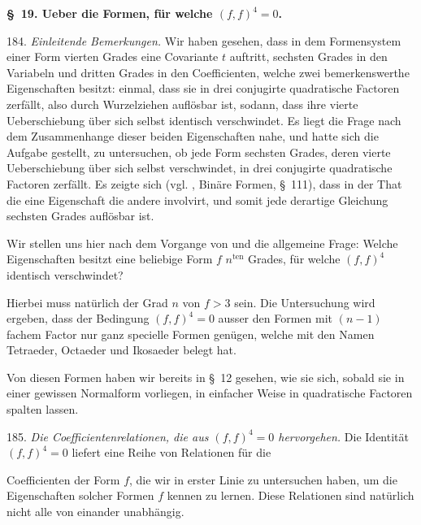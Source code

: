 \begin{center}
\textbf{\S~19. Ueber die Formen, f\"ur welche $(f,f)^4=0$.}
\end{center}

184. \textit{Einleitende Bemerkungen.} Wir haben gesehen, dass in dem Formensystem einer Form vierten Grades eine Covariante $t$ auftritt, sechsten Grades in den Variabeln und dritten Grades in den Coefficienten, welche zwei bemerkenswerthe Eigenschaften besitzt: einmal, dass sie in drei conjugirte quadratische Factoren zerf\"allt, also durch Wurzelziehen aufl\"osbar ist, sodann, dass ihre vierte Ueberschiebung \"uber sich selbst identisch verschwindet. Es liegt die Frage nach dem Zusammenhange dieser beiden Eigenschaften nahe, und  hatte sich die Aufgabe gestellt, zu untersuchen, ob jede Form sechsten Grades, deren vierte Ueberschiebung \"uber sich selbst verschwindet, in drei conjugirte quadratische Factoren zerf\"allt. Es zeigte sich (vgl. , \glqq Bin\"are Formen\grqq{}, \S~111), dass in der That die eine Eigenschaft die andere involvirt, und somit jede derartige Gleichung sechsten Grades aufl\"osbar ist.

Wir stellen uns hier nach dem Vorgange von  und  die allgemeine Frage: Welche Eigenschaften besitzt eine beliebige Form $f$ $n^{\text{ten}}$ Grades, f\"ur welche $(f,f)^4$ identisch verschwindet?

Hierbei muss nat\"urlich der Grad $n$ von $f>3$ sein. Die Untersuchung wird ergeben, dass der Bedingung $(f,f)^4=0$ ausser den Formen mit $(n-1)$fachem Factor nur ganz specielle Formen gen\"ugen, welche  mit den Namen Tetraeder, Octaeder und Ikosaeder belegt hat.

Von diesen Formen haben wir bereits in \S~12 gesehen, wie sie sich, sobald sie in einer gewissen Normalform vorliegen, in einfacher Weise in quadratische Factoren spalten lassen.

185. \textit{Die Coefficientenrelationen, die aus $(f,f)^4=0$ hervorgehen.} Die Identit\"at $(f,f)^4=0$ liefert eine Reihe von Relationen f\"ur die


Coefficienten der Form $f$, die wir in erster Linie zu untersuchen
haben, um die Eigenschaften solcher Formen $f$ kennen zu lernen.
Diese Relationen sind nat\"urlich nicht alle von einander unabh\"angig.


